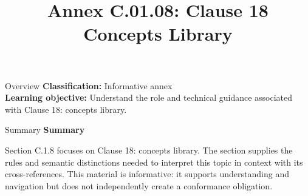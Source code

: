 \documentclass[10pt,letterpaper]{article}
\title{Annex C.01.08: Clause 18 Concepts Library}
\author{}
\date{}
\begin{document}
\maketitle
\begin{CornellOverviewBox}{Overview}
\textbf{Classification:} Informative annex\\[2pt]
\textbf{Learning objective:} Understand the role and technical guidance associated with Clause 18: concepts library.
\end{CornellOverviewBox}\begin{CornellSummaryBox}{Summary}
{\sffamily\bfseries\color{Accent} Summary}\par\vspace{3pt}Section C.1.8 focuses on Clause 18: concepts library. The section supplies the rules and semantic distinctions needed to interpret this topic in context with its cross-references. This material is informative: it supports understanding and navigation but does not independently create a conformance obligation.
\end{CornellSummaryBox}
\end{document}

